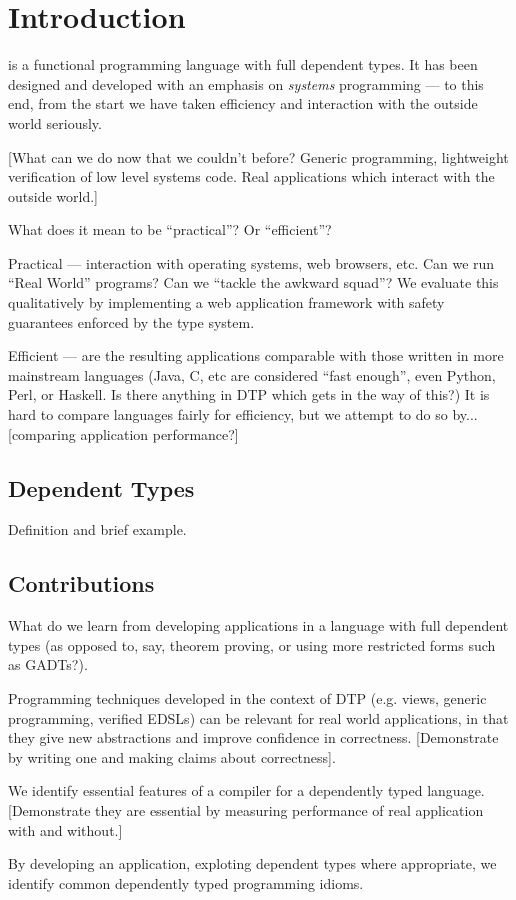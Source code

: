 \section{Introduction}

\Idris{} is a functional programming language with full dependent
types. It has been designed and developed with an emphasis on
\emph{systems} programming --- to this end, from the start we have
taken efficiency and interaction with the outside world seriously. 

[What can we do now that we couldn't before? Generic programming,
  lightweight verification of low level systems code. Real
  applications which interact with the outside world.]

What does it mean to be ``practical''? Or ``efficient''?

Practical --- interaction with operating systems, web browsers,
etc. Can we run ``Real World'' programs? Can we ``tackle the awkward
squad''? We evaluate this qualitatively by implementing a web
application framework with safety guarantees enforced by the type
system.

Efficient --- are the resulting applications comparable with those
written in more mainstream languages (Java, C, etc are considered
``fast enough'', even Python, Perl, or Haskell. Is there anything in
DTP which gets in the way of this?) It is hard to compare languages
fairly for efficiency, but we attempt to do so by... [comparing
  application performance?]

\subsection{Dependent Types}

Definition and brief example.

\subsection{Contributions}

What do we learn from developing applications in a language with full
dependent types (as opposed to, say, theorem proving, or using more
restricted forms such as GADTs?).

Programming techniques developed in the context of DTP (e.g. views,
generic programming, verified EDSLs) can be relevant for real world
applications, in that they give new abstractions and improve
confidence in correctness. [Demonstrate by writing one and making
  claims about correctness].

We identify essential features of a compiler for a dependently typed
language. [Demonstrate they are essential by measuring performance
  of real application with and without.]

By developing an application, exploting dependent types where
appropriate, we identify common dependently typed programming idioms.
